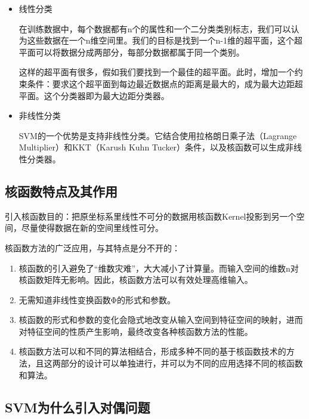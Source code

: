 \begin{itemize}\itemsep0em 

	\item 线性分类

		在训练数据中，每个数据都有n个的属性和一个二分类类别标志，我们可以认为这些数据在一个n维空间里。我们的目标是找到一个n-1维的超平面，这个超平面可以将数据分成两部分，每部分数据都属于同一个类别。

		这样的超平面有很多，假如我们要找到一个最佳的超平面。此时，增加一个约束条件：要求这个超平面到每边最近数据点的距离是最大的，成为最大边距超平面。这个分类器即为最大边距分类器。

	\item 非线性分类

		SVM的一个优势是支持非线性分类。它结合使用拉格朗日乘子法（Lagrange Multiplier）和KKT（Karush Kuhn Tucker）条件，以及核函数可以生成非线性分类器。
\end{itemize}

\subsection{核函数特点及其作用}

引入核函数目的：把原坐标系里线性不可分的数据用核函数Kernel投影到另一个空间，尽量使得数据在新的空间里线性可分。  

核函数方法的广泛应用，与其特点是分不开的：  

\begin{enumerate}\itemsep0em 
		\item 核函数的引入避免了“维数灾难”，大大减小了计算量。而输入空间的维数n对核函数矩阵无影响。因此，核函数方法可以有效处理高维输入。
		\item 无需知道非线性变换函数Φ的形式和参数。
		\item 核函数的形式和参数的变化会隐式地改变从输入空间到特征空间的映射，进而对特征空间的性质产生影响，最终改变各种核函数方法的性能。
		\item 核函数方法可以和不同的算法相结合，形成多种不同的基于核函数技术的方法，且这两部分的设计可以单独进行，并可以为不同的应用选择不同的核函数和算法。
\end{enumerate}

\subsection{SVM为什么引入对偶问题}

